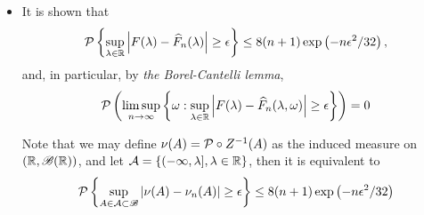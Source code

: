 \documentclass[11pt]{article}
\begin{document}
\begin{itemize}
\item \begin{remark}
It is shown that 
\begin{align*}
{\mathcal P}\left\{ \sup_{\lambda\in {\mathbb R}}\left\lvert F(\lambda) -  \widehat{F}_{n}(\lambda)  \right\rvert\ge \epsilon  \right\} \le 8(n+1)\exp\left(-n\epsilon^{2}/32\right),
\end{align*}
and, in particular, by \emph{the Borel-Cantelli lemma},
\begin{align*}
{\mathcal P}\left(\limsup\limits_{n\rightarrow \infty}\left\{\omega: \sup_{\lambda\in {\mathbb R}}\left\lvert F(\lambda) -  \widehat{F}_{n}(\lambda, \omega)  \right\rvert\ge \epsilon\right\}\right)= 0
\end{align*}

Note that we may define $\nu(A) = {\mathcal P}\circ Z^{-1}(A)$ as the induced measure on $({\mathbb R}, {\mathscr B}({\mathbb R}))$, and let ${\mathcal A} = \left\{(-\infty, \lambda], \lambda\in {\mathbb R}\right\}$, then it is equivalent to
\begin{align*}
{\mathcal P}\left\{ \sup_{A \in {\mathcal A} \subset {\mathscr B}}\left\lvert \nu(A)-  \nu_{n}(A) \right\rvert\ge \epsilon  \right\} \le 8(n+1)\exp\left(-n\epsilon^{2}/32\right)
\end{align*}
\end{remark}
\end{itemize}
\end{document}
